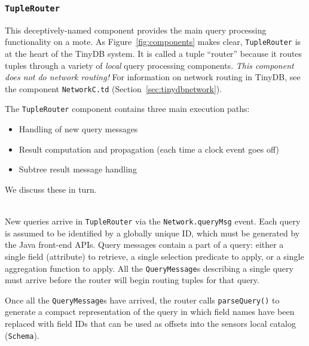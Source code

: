 \documentclass[11pt]{article}
\begin{document}
\subsubsection {\tt TupleRouter}
This deceptively-named component provides the main query processing
functionality on a mote.  As Figure~\ref{fig:components} makes clear,
{\tt TupleRouter} is at the heart of the TinyDB system.  It is called
a tuple ``router'' because it routes tuples through a variety of {\em
local} query processing components.
{\em This component does not do network
routing!}  For information on network routing in TinyDB, see the
component {\tt NetworkC.td} (Section~\ref{sec:tinydbnetwork}).

The {\tt TupleRouter} component contains three main execution
paths:
\begin{itemize}
\item Handling of new query messages
\item Result computation and propagation (each time a clock event goes off)
\item Subtree result message handling
\end{itemize}
We discuss these in turn.

\vspace{1em}
\\
New queries arrive in {\tt TupleRouter} via the {\tt Network.queryMsg} event.  Each query
  is assumed to be identified by a globally unique ID, which must be
  generated by the Java front-end APIs.  Query
  messages contain a part of a query: either a single field (attribute) to
  retrieve, a single selection predicate to apply, or a single
  aggregation function to apply.  All the {\tt QueryMessage}s describing a
  single query must arrive before the router will begin routing tuples
  for that query.

Once all the {\tt QueryMessage}s have arrived, the router calls
  {\tt parseQuery()} to generate a compact representation of the query in
  which field names have been replaced with field IDs that can be used
  as offsets into the sensors local catalog ({\tt Schema}).
  
\end{document}
